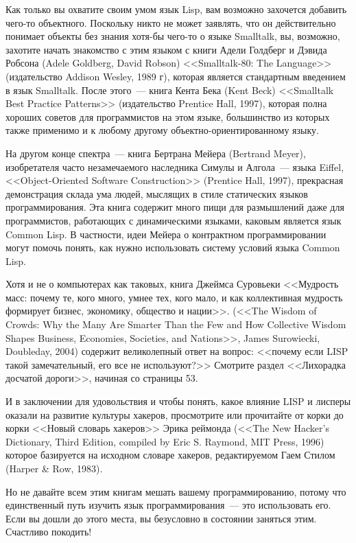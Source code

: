 Как только вы охватите своим умом язык Lisp, вам возможно захочется добавить чего-то
объектного. Поскольку никто не может заявлять, что он действительно понимает объекты без
знания хотя-бы чего-то о языке Smalltalk, вы, возможно, захотите начать знакомство с этим
языком с книги Адели Голдберг и Дэвида Робсона (Adele Goldberg, David Robson)
<<Smalltalk-80: The Language>> (издательство Addison Wesley, 1989 г), которая является
стандартным введением в язык Smalltalk. После этого~--- книга Кента Бека (Kent Beck)
<<Smalltalk Best Practice Patterns>> (издательство Prentice Hall, 1997), которая полна
хороших советов для программистов на этом языке, большинство из которых также применимо и
к любому другому объектно-ориентированному языку.

На другом конце спектра~--- книга Бертрана Мейера (Bertrand Meyer), изобретателя часто
незамечаемого наследника Симулы и Алгола~--- языка Eiffel, <<Object-Oriented Software
Construction>> (Prentice Hall, 1997), прекрасная демонстрация склада ума людей, мыслящих в
стиле статических языков программирования. Эта книга содержит много пищи для размышлений
даже для программистов, работающих с динамическими языками, каковым является язык Common
Lisp.  В частности, идеи Мейера о контрактном программировании могут помочь понять, как
нужно использовать систему условий языка Common Lisp.

Хотя и не о компьютерах как таковых, книга Джеймса Суровьеки <<Мудрость масс: почему те,
кого много, умнее тех, кого мало, и как коллективная мудрость формирует бизнес, экономику,
общество и нации>>. (<<The Wisdom of Crowds: Why the Many Are Smarter Than the Few and How
Collective Wisdom Shapes Business, Economies, Societies, and Nations>>, James Surowiecki,
Doubleday, 2004) содержит великолепный ответ на вопрос: <<почему если LISP такой
замечательный, его все не используют?>> Смотрите раздел <<Лихорадка досчатой дороги>>,
начиная со страницы 53.

И в заключении для удовольствия и чтобы понять, какое влияние LISP и лисперы оказали на
развитие культуры хакеров, просмотрите или прочитайте от корки до корки <<Новый словарь
хакеров>> Эрика реймонда (<<The New Hacker's Dictionary, Third Edition, compiled by Eric
S. Raymond, MIT Press, 1996) которое базируется на исходном словаре хакеров, редактируемом
Гаем Стилом (Harper \& Row, 1983).

Но не давайте всем этим книгам мешать вашему программированию, потому что единственный
путь изучить язык программирования~--- это использовать его. Если вы дошли до этого места,
вы безусловно в состоянии заняться этим.  Счастливо покодить!



